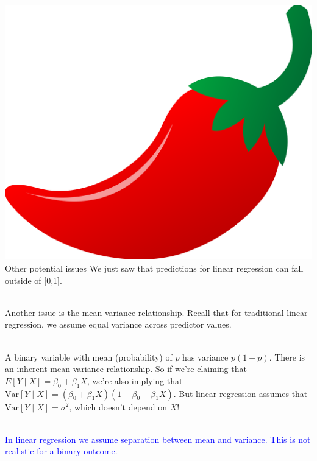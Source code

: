 \documentclass[10pt,t]{beamer}
\begin{document}
\begin{frame}{\includegraphics[scale=0.01]{./figs/chilipepper} Other potential issues}
	We just saw that predictions for linear regression can fall outside of [0,1]. 
	\\ ~\
	
	Another issue is the mean-variance relationship. Recall that for traditional linear regression, we assume equal variance across predictor values.
	\\ ~\ 
	
	A binary variable with mean (probability) of $p$ has variance $p(1-p)$. There is an inherent mean-variance relationship. So if we're claiming that $E[Y \mid X] = \beta_0 + \beta_1X$, we're also implying that $\text{Var}[Y \mid X] = (\beta_0 + \beta_1 X)(1 - \beta_0 - \beta_1 X)$. But linear regression assumes that $\text{Var}[Y \mid X] = \sigma^2$, which doesn't depend on $X$!
	\\ ~\ 
	
	 \textcolor{blue}{In linear regression we assume separation between mean and variance. This is not realistic for a binary outcome.} 
\end{frame}
\end{document}
